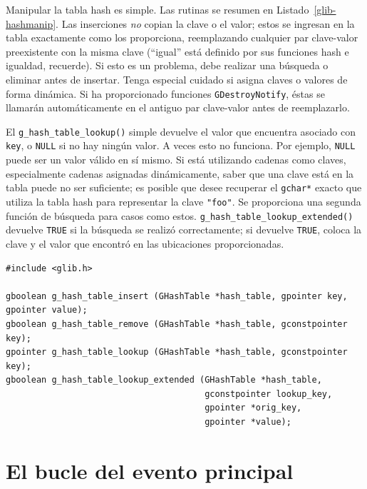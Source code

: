 Manipular la tabla hash es simple. Las rutinas se resumen en Listado~\ref{glib-hashmanip}. Las inserciones \emph{no} copian la clave o el valor; estos se ingresan en la tabla exactamente como los proporciona, reemplazando cualquier par clave-valor preexistente con la misma clave (``igual'' está definido por sus funciones hash e igualdad, recuerde). Si esto es un problema, debe realizar una búsqueda o eliminar antes de insertar. Tenga especial cuidado si asigna claves o valores de forma dinámica. Si ha proporcionado funciones \lstinline{GDestroyNotify}, éstas se llamarán automáticamente en el antiguo par clave-valor antes de reemplazarlo.

El \lstinline{g_hash_table_lookup()} simple devuelve el valor que encuentra asociado con \lstinline{key}, o \lstinline{NULL} si no hay ningún valor. A veces esto no funciona. Por ejemplo, \lstinline{NULL} puede ser un valor válido en sí mismo. Si está utilizando cadenas como claves, especialmente cadenas asignadas dinámicamente, saber que una clave está en la tabla puede no ser suficiente; es posible que desee recuperar el \lstinline{gchar*} exacto que utiliza la tabla hash para representar la clave \lstinline{"foo"}. Se proporciona una segunda función de búsqueda para casos como estos. \lstinline{g_hash_table_lookup_extended()} devuelve \lstinline{TRUE} si la búsqueda se realizó correctamente; si devuelve \lstinline{TRUE}, coloca la clave y el valor que encontró en las ubicaciones proporcionadas.

\begin{lstlisting}[float, caption={Manipular una \lstinline{GHashTable}}, label=glib-hashmanip]
#include <glib.h>

gboolean g_hash_table_insert (GHashTable *hash_table, gpointer key, gpointer value);
gboolean g_hash_table_remove (GHashTable *hash_table, gconstpointer key);
gpointer g_hash_table_lookup (GHashTable *hash_table, gconstpointer key);
gboolean g_hash_table_lookup_extended (GHashTable *hash_table,
                                       gconstpointer lookup_key,
                                       gpointer *orig_key,
                                       gpointer *value);
\end{lstlisting}

\section{El bucle del evento principal}
\label{glib-main-event-loop}

